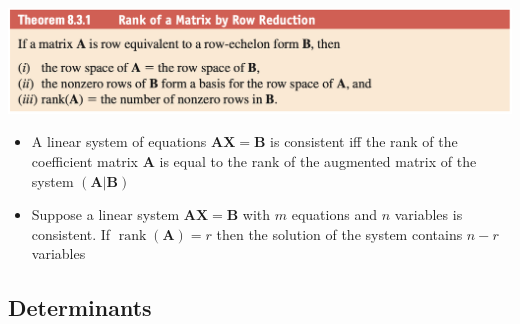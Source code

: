 \documentclass{article}
\newcommand{\rank}{\operatorname{rank}}
\begin{document}
\includegraphics[scale=0.443]{rank-by-row-reduction}

\begin{itemize}
  \item A linear system of equations $\mathbf{A} \mathbf{X} = \mathbf{B}$ is consistent iff the rank of the coefficient matrix $\mathbf{A}$ is equal to the rank of the augmented matrix of the system $(\mathbf{A} | \mathbf{B})$

  \item Suppose a linear system $\mathbf{A} \mathbf{X} = \mathbf{B}$ with $m$ equations and $n$ variables is consistent. If $\rank(\mathbf{A}) = r$ then the solution of the system contains $n - r$ variables
\end{itemize}

\subsection{Determinants}
\end{document}
